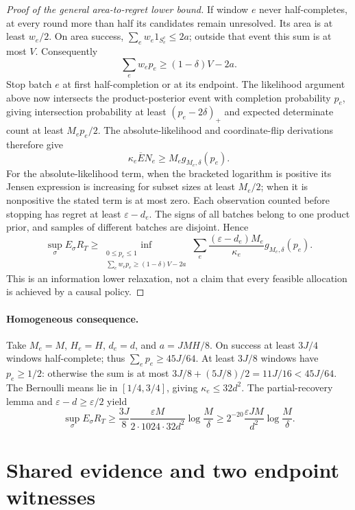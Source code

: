 \documentclass[11pt]{article}
\theoremstyle{remark}
\begin{document}
\begin{proof}[Proof of the general area-to-regret lower bound]
If window $e$ never half-completes, at every round more than half its
candidates remain unresolved. Its area is at least $w_e/2$. On area success,
$\sum_ew_e1_{S_e^c}\le2a$; outside that event this sum is at most $V$.
Consequently
\[
 \sum_ew_ep_e\ge(1-\delta)V-2a.
\]
Stop batch $e$ at first half-completion or at its endpoint. The likelihood
argument above now intersects the product-posterior event with completion
probability $p_e$, giving intersection probability at least
$(p_e-2\delta)_+$ and expected determinate count at least $M_ep_e/2$.
The absolute-likelihood and coordinate-flip derivations therefore give
\[
 \kappa_e\overline EN_e\ge M_eg_{M_e,\delta}(p_e).
\]
For the absolute-likelihood term, when the bracketed logarithm is positive
its Jensen expression is increasing for subset sizes at least $M_e/2$;
when it is nonpositive the stated term is at most zero. Each observation
counted before stopping has regret at least $\varepsilon-d_e$.
The signs of all batches belong to one product prior, and samples of
different batches are disjoint. Hence
\begin{equation}
\label{eq:allocation_lower}
 \sup_\sigma E_\sigma R_T\ge
 \inf_{\substack{0\le p_e\le1\\
       \sum_ew_ep_e\ge(1-\delta)V-2a}}
 \sum_e\frac{(\varepsilon-d_e)M_e}{\kappa_e}
                  g_{M_e,\delta}(p_e).
\end{equation}
This is an information lower relaxation, not a claim that every feasible
allocation is achieved by a causal policy.
\end{proof}

\paragraph{Homogeneous consequence.}
Take $M_e=M$, $H_e=H$, $d_e=d$, and $a=JMH/8$. On success at least $3J/4$
windows half-complete; thus $\sum_ep_e\ge45J/64$. At least $3J/8$ windows
have $p_e\ge1/2$: otherwise the sum is at most
$3J/8+(5J/8)/2=11J/16<45J/64$.
The Bernoulli means lie in $[1/4,3/4]$, giving $\kappa_e\le32d^2$.
The partial-recovery lemma and $\varepsilon-d\ge\varepsilon/2$ yield
\[
 \sup_\sigma E_\sigma R_T\ge
 \frac{3J}{8}\frac{\varepsilon M}{2\cdot1024\cdot32d^2}
             \log\frac M\delta
 \ge2^{-20}\frac{\varepsilon JM}{d^2}\log\frac M\delta.
\]

\section{Shared evidence and two endpoint witnesses}
\label{app:reuse}
\end{document}
